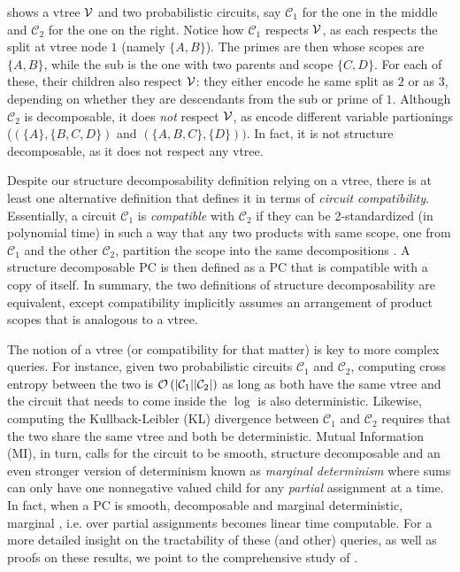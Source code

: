  shows a vtree $\operatorname{\mathcal{V}}$ and two probabilistic circuits, say
$\mathcal{C}_1$ for the one in the middle and $\mathcal{C}_2$ for the one on the right. Notice how
$\mathcal{C}_1$ respects $\operatorname{\mathcal{V}}$, as each \inode[fill=boxred!70]{\newProdNode} respects the split
at vtree node $1$ (namely $\{A,B\}$). The primes are then \inode[fill=boxpurple!60]{\newSumNode}
whose scopes are $\{A,B\}$, while the sub is the one with two parents and scope $\{C,D\}$. For each
of these, their children \inode[fill=boxbrown!60]{\newProdNode} also respect $\operatorname{\mathcal{V}}$: they either
encode he same split as $2$ or as $3$, depending on whether they are descendants from the sub or
prime of $1$. Although $\mathcal{C}_2$ is decomposable, it does \emph{not} respect $\operatorname{\mathcal{V}}$, as
\inode[fill=boxred!70]{\newProdNode} encode different variable partionings ($(\{A\},\{B,C,D\})$ and
$(\{A,B,C\},\{D\}))$. In fact, it is not structure decomposable, as it does not respect any vtree.

Despite our structure decomposability definition relying on a vtree, there is at least one
alternative definition that defines it in terms of \emph{circuit compatibility}. Essentially, a
circuit $\mathcal{C}_1$ is \emph{compatible} with $\mathcal{C}_2$ if they can be 2-standardized (in
polynomial time) in such a way that any two products with same scope, one from $\mathcal{C}_1$ and
the other $\mathcal{C}_2$, partition the scope into the same decompositions \citep{vergari21}. A
structure decomposable PC is then defined as a PC that is compatible with a copy of itself. In
summary, the two definitions of structure decomposability are equivalent, except compatibility
implicitly assumes an arrangement of product scopes that is analogous to a vtree.

The notion of a vtree (or compatibility for that matter) is key to more complex queries. For
instance, given two probabilistic circuits $\mathcal{C}_1$ and $\mathcal{C}_2$, computing cross
entropy between the two is $\mathcal{O}\left(|\mathcal{C}_1||\mathcal{C}_2|\right)$ as long as both have
the same vtree and the circuit that needs to come inside the $\log$ is also deterministic.
Likewise, computing the Kullback-Leibler (KL) divergence between $\mathcal{C}_1$ and
$\mathcal{C}_2$ requires that the two share the same vtree and both be deterministic. Mutual
Information (MI), in turn, calls for the circuit to be smooth, structure decomposable and an even
stronger version of determinism known as \emph{marginal determinism} where sums can only have one
nonnegative valued child for any \emph{partial} assignment at a time. In fact, when a PC is smooth,
decomposable and marginal deterministic, marginal \map{}, i.e. \map{} over partial assignments
becomes linear time computable. For a more detailed insight on the tractability of these (and
other) queries, as well as proofs on these results, we point to the comprehensive study of
\citet{vergari21}.


